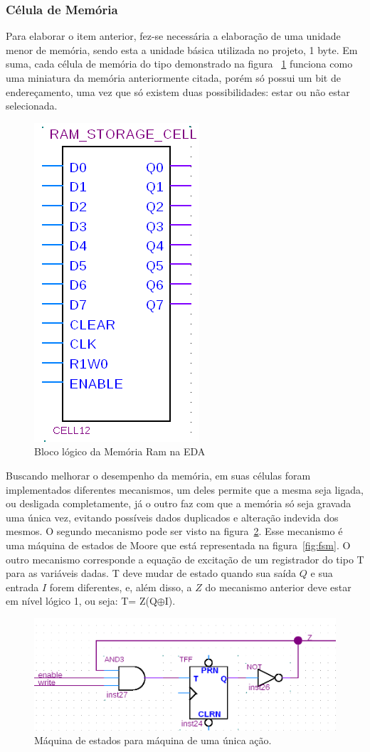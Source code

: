 \documentclass[12pt]{article}
\begin{document}
\subsubsection{Célula de Memória}

Para elaborar o item anterior, fez-se necessária a elaboração de uma unidade menor de memória, sendo esta a unidade básica utilizada no projeto, 1 byte. Em suma, cada célula de memória do tipo demonstrado na figura ~\ref{fig:celulamemoria} funciona como uma miniatura da memória anteriormente citada, porém só possui um bit de endereçamento, uma vez que só existem duas possibilidades: estar ou não estar selecionada.

\begin{figure}[!htbp]
\centering
\includegraphics[width=.3\textwidth]{img/p4/celulamemoria.png}
\caption{Bloco lógico da Memória Ram na EDA}
\label{fig:celulamemoria}
\end{figure}

Buscando melhorar o desempenho da memória, em suas células foram implementados diferentes mecanismos, um deles permite que a mesma seja ligada, ou desligada completamente, já o outro faz com que a memória só seja gravada uma única vez, evitando possíveis dados duplicados e alteração indevida dos mesmos. O segundo mecanismo pode ser visto na figura~\ref{fig:ff1}. Esse mecanismo é uma máquina de estados de Moore que está representada na figura~\ref{fig:fsm}. O outro mecanismo corresponde a equação de excitação de um registrador do tipo T para as variáveis dadas. T deve mudar de estado quando sua saída $Q$ e sua entrada $I$ forem diferentes, e, além disso, a $Z$ do mecanismo anterior deve estar em nível lógico 1, ou seja: T= Z(Q$\oplus$I).

\begin{figure}[!htbp]
\centering
\includegraphics[width=.8\textwidth]{img/p4/ff1.png}
\caption{Máquina de estados para máquina de uma única ação.}
\label{fig:ff1}
\end{figure}
\end{document}
